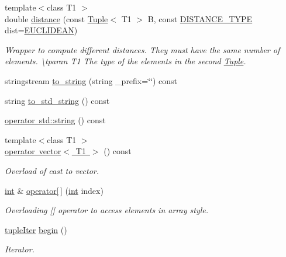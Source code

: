 \begin{DoxyCompactItemize}
{\footnotesize template$<$class T1 $>$ }\\double \mbox{\hyperlink{class_tuple_af47521571361439c96392dee70a79cc7}{distance}} (const \mbox{\hyperlink{class_tuple}{Tuple}}$<$ T1 $>$ B, const \mbox{\hyperlink{maths_8hh_ac50d7263b1cae8691420b86282b27f90}{D\+I\+S\+T\+A\+N\+C\+E\+\_\+\+T\+Y\+PE}} dist=\mbox{\hyperlink{maths_8hh_ac50d7263b1cae8691420b86282b27f90a81bbbc4428c3ff3f1327e94957e2b5f1}{E\+U\+C\+L\+I\+D\+E\+AN}})
\begin{DoxyCompactList}\small\item\em Wrapper to compute different distances. They must have the same number of elements. \textbackslash{}tparan T1 The type of the elements in the second \mbox{\hyperlink{class_tuple}{Tuple}}. \end{DoxyCompactList}\item 
stringstream \mbox{\hyperlink{class_tuple_a029b06891c82353ae40c13199830e90a}{to\+\_\+string}} (string \+\_\+prefix=\char`\"{}\char`\"{}) const
\item 
string \mbox{\hyperlink{class_tuple_a2c8e5f6fb1abb2b11ab222b7ce772569}{to\+\_\+std\+\_\+string}} () const
\item 
\mbox{\hyperlink{class_tuple_a9a4516890830c7a8bf96c9325718c8c3}{operator std\+::string}} () const
\item 
{\footnotesize template$<$class T1 $>$ }\\\mbox{\hyperlink{class_tuple_a924a25df1578ffab148c69a1a1000491}{operator vector$<$ T1 $>$}} () const
\begin{DoxyCompactList}\small\item\em Overload of cast to vector. \end{DoxyCompactList}\item 
\mbox{\hyperlink{draw_8hh_aa620a13339ac3a1177c86edc549fda9b}{int}} \& \mbox{\hyperlink{class_tuple_acfc65dc0a9af20f2ff8cff2bf3448324}{operator\mbox{[}$\,$\mbox{]}}} (\mbox{\hyperlink{draw_8hh_aa620a13339ac3a1177c86edc549fda9b}{int}} index)
\begin{DoxyCompactList}\small\item\em Overloading \mbox{[}\mbox{]} operator to access elements in array style. \end{DoxyCompactList}\item 
\mbox{\hyperlink{maths_8hh_ad22dcdeefda7d41523cc1604953eb6cc}{tuple\+Iter}} \mbox{\hyperlink{class_tuple_a205dfb3c3dcad03ced830b5c9687d225}{begin}} ()
\begin{DoxyCompactList}\small\item\em Iterator. \end{DoxyCompactList}\item 

\end{DoxyCompactItemize}
